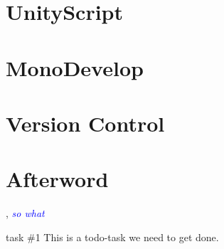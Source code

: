 \documentclass[BSP,english,oneside]{classes/gucthesis}
\newcommand{\comment}[1]{\textcolor{blue}{\emph{#1}}}
\newcommand{\todo}[1]{{\color{green}#1}}
\begin{document}
\chapter{UnityScript}
	\label{chap:UnityScript}
	


\chapter{MonoDevelop}
	\label{chap:MonoDevelop}
	


\chapter{Version Control}
	\label{chap:VersionControl}
	


\chapter{Afterword}
	\label{chap:afterword}
	






\appendix %
\appendixpage
\addappheadtotoc







\GUC, 
\comment{so what}

\todo{task \#1}
This is a todo-task we need to get done.
\end{document}

